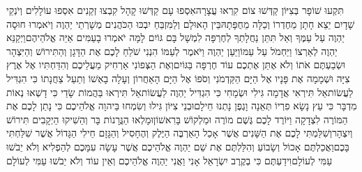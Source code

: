 \documentclass[../main/main.tex]{subfiles}
\begin{document}
\begin{multicols}{\ncols}
תִּקְעוּ שׁוֹפָר בְּצִיּוֹן קַדְּשׁוּ צוֹם קִרְאוּ עֲצָרָה\PreVerseSpace{}אִסְפוּ עָם קַדְּשׁוּ קָהָל קִבְצוּ זְקֵנִים אִסְפוּ עוֹלָלִים וְיֹנְקֵי שָׁדָיִם יֵצֵא חָתָן מֵחֶדְרוֹ וְכַלָּה מֵחֻפָּתָהּ\PreVerseSpace{}בֵּין הָאוּלָם וְלַמִּזְבֵּחַ יִבְכּוּ הַכֹּהֲנִים מְשָׁרְתֵי יַהְוֶה וְיֹאמְרוּ חוּסָה יַהְוֶה עַל עַמֶּךָ וְאַל תִּתֵּן נַחֲלָתְךָ לְחֶרְפָּה לִמְשָׁל בָּם גּוֹיִם לָמָּה יֹאמְרוּ בָעַמִּים אַיֵּה אֱלֹהֵיהֶם\PreVerseSpace{}וַיְקַנֵּא יַהְוֶה לְאַרְצוֹ וַיַּחְמֹל עַל עַמּוֹ\PreVerseSpace{}וַיַּעַן יַהְוֶה וַיֹּאמֶר לְעַמּוֹ הִנְנִי שֹׁלֵחַ לָכֶם אֶת הַדָּגָן וְהַתִּירוֹשׁ וְהַיִּצְהָר וּשְׂבַעְתֶּם אֹתוֹ וְלֹא אֶתֵּן אֶתְכֶם עוֹד חֶרְפָּה בַּגּוֹיִם\PreVerseSpace{}וְאֶת הַצְּפוֹנִי אַרְחִיק מֵעֲלֵיכֶם וְהִדַּחְתִּיו אֶל אֶרֶץ צִיָּה וּשְׁמָמָה אֶת פָּנָיו אֶל הַיָּם הַקַּדְמֹנִי וְסֹפוֹ אֶל הַיָּם הָאַחֲרוֹן וְעָלָה בָאְשׁוֹ וְתַעַל צַחֲנָתוֹ כִּי הִגְדִּיל לַעֲשׂוֹת\PreVerseSpace{}אַל תִּירְאִי אֲדָמָה גִּילִי וּשְׂמָחִי כִּי הִגְדִּיל יַהְוֶה לַעֲשׂוֹת\PreVerseSpace{}אַל תִּירְאוּ בַּהֲמוֹת שָׂדַי כִּי דָשְׁאוּ נְאוֹת מִדְבָּר כִּי עֵץ נָשָׂא פִרְיוֹ תְּאֵנָה וָגֶפֶן נָתְנוּ חֵילָם\PreVerseSpace{}וּבְנֵי צִיּוֹן גִּילוּ וְשִׂמְחוּ בַּיהוָה אֱלֹהֵיכֶם כִּי נָתַן לָכֶם אֶת הַמּוֹרֶה לִצְדָקָה וַיּוֹרֶד לָכֶם גֶּשֶׁם מוֹרֶה וּמַלְקוֹשׁ בָּרִאשׁוֹן\PreVerseSpace{}וּמָלְאוּ הַגֳּרָנוֹת בָּר וְהֵשִׁיקוּ הַיְקָבִים תִּירוֹשׁ וְיִצְהָר\PreVerseSpace{}וְשִׁלַּמְתִּי לָכֶם אֶת הַשָּׁנִים אֲשֶׁר אָכַל הָאַרְבֶּה הַיֶּלֶק וְהֶחָסִיל וְהַגָּזָם חֵילִי הַגָּדוֹל אֲשֶׁר שִׁלַּחְתִּי בָּכֶם\PreVerseSpace{}וַאֲכַלְתֶּם אָכוֹל וְשָׂבוֹעַ וְהִלַּלְתֶּם אֶת שֵׁם יַהְוֶה אֱלֹהֵיכֶם אֲשֶׁר עָשָׂה עִמָּכֶם לְהַפְלִיא וְלֹא יֵבֹשׁוּ עַמִּי לְעוֹלָם\PreVerseSpace{}וִידַעְתֶּם כִּי בְקֶרֶב יִשְׂרָאֵל אָנִי וַאֲנִי יַהְוֶה אֱלֹהֵיכֶם וְאֵין עוֹד וְלֹא יֵבֹשׁוּ עַמִּי לְעוֹלָם\OpenSection{}\par

\end{multicols}
\end{document}
